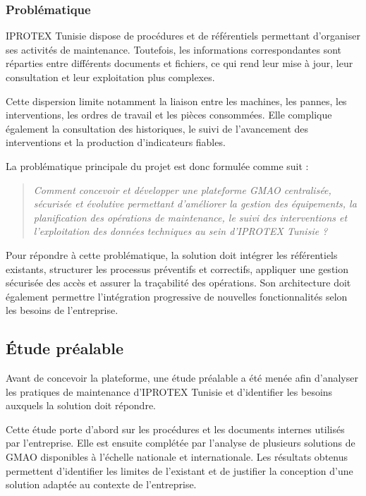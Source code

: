 \subsubsection{Problématique}

IPROTEX Tunisie dispose de procédures et de référentiels permettant d’organiser ses activités de maintenance. Toutefois, les informations correspondantes sont réparties entre différents documents et fichiers, ce qui rend leur mise à jour, leur consultation et leur exploitation plus complexes.

Cette dispersion limite notamment la liaison entre les machines, les pannes, les interventions, les ordres de travail et les pièces consommées. Elle complique également la consultation des historiques, le suivi de l’avancement des interventions et la production d’indicateurs fiables.

La problématique principale du projet est donc formulée comme suit :

\begin{quote}
\textit{Comment concevoir et développer une plateforme GMAO centralisée, sécurisée et évolutive permettant d’améliorer la gestion des équipements, la planification des opérations de maintenance, le suivi des interventions et l’exploitation des données techniques au sein d’IPROTEX Tunisie ?}
\end{quote}

Pour répondre à cette problématique, la solution doit intégrer les référentiels existants, structurer les processus préventifs et correctifs, appliquer une gestion sécurisée des accès et assurer la traçabilité des opérations. Son architecture doit également permettre l’intégration progressive de nouvelles fonctionnalités selon les besoins de l’entreprise.


\subsection{Étude préalable}

Avant de concevoir la plateforme, une étude préalable a été menée afin d’analyser les pratiques de maintenance d’IPROTEX Tunisie et d’identifier les besoins auxquels la solution doit répondre.

Cette étude porte d’abord sur les procédures et les documents internes utilisés par l’entreprise. Elle est ensuite complétée par l’analyse de plusieurs solutions de GMAO disponibles à l’échelle nationale et internationale. Les résultats obtenus permettent d’identifier les limites de l’existant et de justifier la conception d’une solution adaptée au contexte de l’entreprise.

